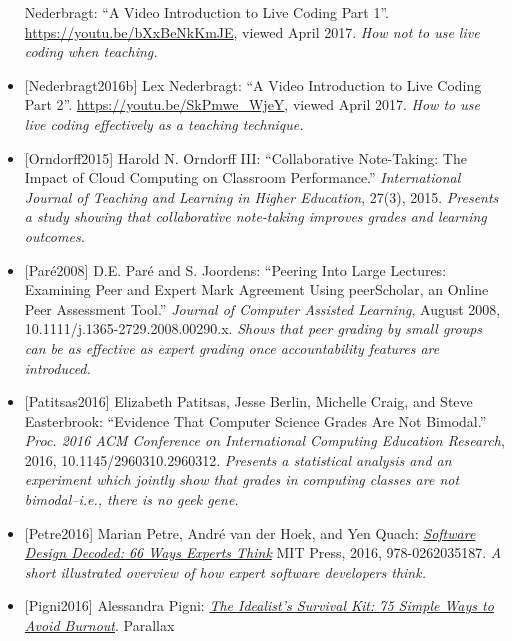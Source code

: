\documentclass[10pt,statementpaper]{memoir}
\begin{document}
\begin{itemize}
  Nederbragt: ``A Video Introduction to Live Coding Part 1''.
  \url{https://youtu.be/bXxBeNkKmJE}, viewed April 2017. \emph{How not
  to use live coding when teaching.}
\item
  \protect\hypertarget{live-coding-good}{}{{[}Nederbragt2016b{]}} Lex
  Nederbragt: ``A Video Introduction to Live Coding Part 2''.
  \url{https://youtu.be/SkPmwe_WjeY}, viewed April 2017. \emph{How to
  use live coding effectively as a teaching technique.}
\item
  \protect\hypertarget{orndorff-note-taking}{}{{[}Orndorff2015{]}}
  Harold N. Orndorff III: ``Collaborative Note-Taking: The Impact of
  Cloud Computing on Classroom Performance.'' \emph{International
  Journal of Teaching and Learning in Higher Education}, 27(3), 2015.
  \emph{Presents a study showing that collaborative note-taking improves
  grades and learning outcomes.}
\item
  \protect\hypertarget{pare-joordens-peer}{}{{[}Paré2008{]}} {D.E. Paré
  and S. Joordens: ``Peering Into Large Lectures: Examining Peer and
  Expert Mark Agreement Using peerScholar, an Online Peer Assessment
  Tool.'' \emph{Journal of Computer Assisted Learning}, August 2008,
  10.1111/j.1365-2729.2008.00290.x. \emph{Shows that peer grading by
  small groups can be as effective as expert grading once accountability
  features are introduced.}}
\item
  \protect\hypertarget{patitsas-cs-grades}{}{{[}Patitsas2016{]}}
  Elizabeth Patitsas, Jesse Berlin, Michelle Craig, and Steve
  Easterbrook: ``Evidence That Computer Science Grades Are Not
  Bimodal.'' \emph{Proc. 2016 ACM Conference on International Computing
  Education Research}, 2016, 10.1145/2960310.2960312. \emph{Presents a
  statistical analysis and an experiment which jointly show that grades
  in computing classes are not bimodal--i.e., there is no geek gene.}
\item
  \protect\hypertarget{petre-expertise}{}{{[}Petre2016{]}} Marian Petre,
  André van der Hoek, and Yen Quach:
  \emph{\href{https://www.amazon.com/Software-Design-Decoded-Experts-Think/dp/0262035189/}{Software
  Design Decoded: 66 Ways Experts Think}} MIT Press, 2016,
  978-0262035187. \emph{A short illustrated overview of how expert
  software developers think.}
\item
  \protect\hypertarget{pigni-idealists}{}{{[}Pigni2016{]}} {Alessandra
  Pigni:
  \emph{\href{https://www.amazon.com/Idealists-Survival-Kit-Prevent-Burnout/dp/1941529348/}{The
  Idealist's Survival Kit: 75 Simple Ways to Avoid Burnout}}. Parallax
}
\end{itemize}
\end{document}

